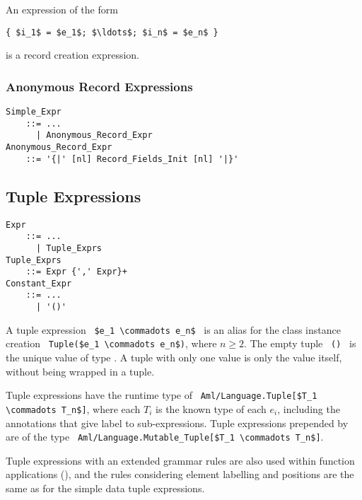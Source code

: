 An expression of the form
\begin{lstlisting}
{ $i_1$ = $e_1$; $\ldots$; $i_n$ = $e_n$ }
\end{lstlisting}
is a record creation expression. 





\subsubsection{Anonymous Record Expressions}
\label{sec:anonymous-record-expressions}

\grammar\begin{lstlisting}
Simple_Expr
    ::= ...
      | Anonymous_Record_Expr
Anonymous_Record_Expr
    ::= '{|' [nl] Record_Fields_Init [nl] '|}'
\end{lstlisting}





\subsection{Tuple Expressions}
\label{sec:tuples}

\grammar\begin{lstlisting}
Expr
    ::= ...
      | Tuple_Exprs
Tuple_Exprs 
    ::= Expr {',' Expr}+
Constant_Expr 
    ::= ...
      | '()'
\end{lstlisting}

A tuple expression ~\lstinline!$e_1 \commadots e_n$!~ is an alias for the class instance creation ~\lstinline!Tuple($e_1 \commadots e_n$)!, where $n \geq 2$. The empty tuple ~\lstinline!()!~ is the unique value of type . A tuple with only one value is only the value itself, without being wrapped in a tuple.  

Tuple expressions have the runtime type of ~\lstinline!Aml/Language.Tuple[$T_1 \commadots T_n$]!, where each $T_i$ is the known type of each $e_i$, including the annotations that give label to sub-expressions. Tuple expressions prepended by  are of the type ~\lstinline!Aml/Language.Mutable_Tuple[$T_1 \commadots T_n$]!.

Tuple expressions with an extended grammar rules are also used within function applications (), and the rules considering element labelling and positions are the same as for the simple data tuple expressions. 





